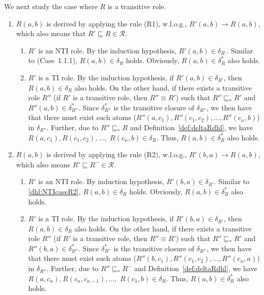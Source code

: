 We next study the case where $R$ is a transitive role.

\begin{enumerate}[leftmargin=12ex,label=Case~2.\arabic*, ref=Case~2.\arabic*]
\item $R(a,b)$ is derived by applying the rule (R1), w.l.o.g., $R'(a,b)\rightarrow R(a,b)$,
    which also means that $R'\sqsubseteq R\in\mathcal{R}$.\label{dhl:TcaseR1}
    \begin{enumerate}[leftmargin=8ex,label=Case~2.1.\arabic*]
    \item $R'$ is an NTI role. By the induction hypothesis, $R'(a,b)\in\delta_{R'}$.
        Similar to (Case~1.1.1), $R(a,b)\in\delta_{R}$ holds.
        Obviously, $R(a,b)\in\delta_{R}^*$ also holds.

    \item $R'$ is a TI role. By the induction hypothesis, if $R'(a,b)\in\delta_{R'}$,
        then $R(a,b)\in\delta_R$ also holds. On the other hand, if there exists a transitive role
        $R''$ (if $R'$ is a transitive role, then $R''\equiv R'$) such that
        $R''\sqsubseteq_* R'$ and $R''(a,b)\in\delta_{R''}^*$. Since $\delta_{R''}^*$ is
        the transitive closure of $\delta_{R''}$, we then have that there must
        exist such atoms ($R''(a,c_1),R''(c_1,c_2),...,R''(c_n,b)$) in $\delta_{R''}$.
        Further, due to $R''\sqsubseteq_* R$ and Definition~\ref{def:deltaRdhl},
        we have $R(a,c_1),R(c_1,c_2),...,$ $R(c_n,b)\in\delta_{R}$. Thus, $R(a,b)\in\delta_{R}^*$
        also holds.
    \end{enumerate}

\item $R(a,b)$ is derived by applying the rule (R2), w.l.o.g., $R'(b,a)\rightarrow R(a,b)$,
    which also means $R'\sqsubseteq R^-\in\mathcal{R}$.\label{dhl:TcaseR2}
    \begin{enumerate}[leftmargin=8ex,label=Case~2.2.\arabic*]
    \item $R'$ is an NTI role. By induction hypothesis, $R'(b,a)\in\delta_{R'}$.
        Similar to \ref{dhl:NTIcaseR2}, $R(a,b)\in\delta_{R}$ holds.
        Obviously, $R(a,b)\in\delta_{R}^*$ also holds.

    \item $R'$ is a TI role. By the induction hypothesis, if $R'(b,a)\in\delta_{R'}$,
        then $R(a,b)\in\delta_R$ also holds. On the other hand, if there exists a transitive role
        $R''$ (if $R'$ is a transitive role, then $R''\equiv R'$) such that
        $R''\sqsubseteq_* R'$ and $R''(b,a)\in\delta_{R''}^*$. Since $\delta_{R''}^*$ is
        the transitive closure of $\delta_{R''}$, we then have that there must
        exist such atoms ($R''(b,c_1),R''(c_1,c_2),...,R''(c_n,a)$) in $\delta_{R''}$.
        Further, due to $R''\sqsubseteq_* R^-$ and Definition~\ref{def:deltaRdhl},
        we have $R(a,c_n),R(c_n,c_{n-1}),...,$ $R(c_1,b)\in\delta_{R}$. Thus, $R(a,b)\in\delta_{R}^*$
        also holds.
    \end{enumerate}


\end{enumerate}
